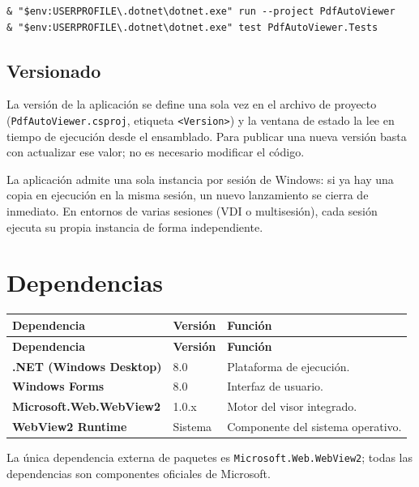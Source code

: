 \documentclass[11pt,a4paper]{article}
\begin{document}
\begin{lstlisting}[caption={Ejecución con un SDK local (sin administrador).}]
& "$env:USERPROFILE\.dotnet\dotnet.exe" run --project PdfAutoViewer
& "$env:USERPROFILE\.dotnet\dotnet.exe" test PdfAutoViewer.Tests
\end{lstlisting}

\subsection{Versionado}
La versión de la aplicación se define una sola vez en el archivo de proyecto
(\texttt{PdfAutoViewer.csproj}, etiqueta \texttt{<Version>}) y la ventana de
estado la lee en tiempo de ejecución desde el ensamblado. Para publicar una nueva
versión basta con actualizar ese valor; no es necesario modificar el código.

La aplicación admite una sola instancia por sesión de Windows: si ya hay una
copia en ejecución en la misma sesión, un nuevo lanzamiento se cierra de
inmediato. En entornos de varias sesiones (VDI o multisesión), cada sesión
ejecuta su propia instancia de forma independiente.

\section{Dependencias}
\begin{xltabular}{\textwidth}{@{} >{\bfseries}p{5.2cm} p{2.4cm} L @{}}
\toprule
\normalfont\textbf{Dependencia} & \textbf{Versión} & \textbf{Función} \\
\midrule
\endfirsthead
\toprule
\normalfont\textbf{Dependencia} & \textbf{Versión} & \textbf{Función} \\
\midrule
\endhead
\bottomrule
\endfoot
.NET (Windows Desktop) & 8.0 & Plataforma de ejecución. \\
Windows Forms & 8.0 & Interfaz de usuario. \\
Microsoft.Web.WebView2 & 1.0.x & Motor del visor integrado. \\
WebView2 Runtime & Sistema & Componente del sistema operativo. \\
\bottomrule
\end{xltabular}

La única dependencia externa de paquetes es \texttt{Microsoft.Web.WebView2};
todas las dependencias son componentes oficiales de Microsoft.
\end{document}
